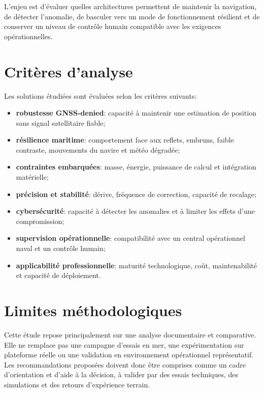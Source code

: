\documentclass[12pt, a4paper, twoside, openright]{report}
\begin{document}
L’enjeu est d’évaluer quelles architectures permettent de maintenir la navigation, de détecter l’anomalie, de basculer vers un mode de fonctionnement résilient et de conserver un niveau de contrôle humain compatible avec les exigences opérationnelles.

\section{Critères d’analyse}
Les solutions étudiées sont évaluées selon les critères suivants:
\begin{itemize}
    \item \textbf{robustesse GNSS-denied}: capacité à maintenir une estimation de position sans signal satellitaire fiable;
    \item \textbf{résilience maritime}: comportement face aux reflets, embruns, faible contraste, mouvements du navire et météo dégradée;
    \item \textbf{contraintes embarquées}: masse, énergie, puissance de calcul et intégration matérielle;
    \item \textbf{précision et stabilité}: dérive, fréquence de correction, capacité de recalage;
    \item \textbf{cybersécurité}: capacité à détecter les anomalies et à limiter les effets d’une compromission;
    \item \textbf{supervision opérationnelle}: compatibilité avec un central opérationnel naval et un contrôle humain;
    \item \textbf{applicabilité professionnelle}: maturité technologique, coût, maintenabilité et capacité de déploiement.
\end{itemize}

\section{Limites méthodologiques}
Cette étude repose principalement sur une analyse documentaire et comparative. Elle ne remplace pas une campagne d’essais en mer, une expérimentation sur plateforme réelle ou une validation en environnement opérationnel représentatif. Les recommandations proposées doivent donc être comprises comme un cadre d’orientation et d’aide à la décision, à valider par des essais techniques, des simulations et des retours d’expérience terrain.

\cleardoublepage

\end{document}
